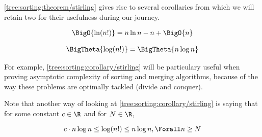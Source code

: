 \ref{tree:sorting:theorem/stirling} gives rise to several corollaries from
which we will retain two for their usefulness during our journey.


\begin{corollary}
\begin{align*}
\BigO{\ln(n!)} &= n \ln n - n + \BigO{n}\\
\end{align*}
\end{corollary}



\begin{corollary}
\label{tree:sorting:corollary/stirling}
\begin{align*}
\BigTheta{\log(n!)} &= \BigTheta{n \log n}\\
\end{align*}
\end{corollary}


For example, \ref{tree:sorting:corollary/stirling} will be particulary useful
when proving asymptotic complexity of sorting and merging algorithms, because
of the way these problems are optimally tackled (divide and conquer).

Note that another way of looking at \ref{tree:sorting:corollary/stirling} is
saying that for some constant $c \in \R$ and for $N \in \R$,

\begin{displaymath}
c \cdot n \log n \leq \log(n!) \leq n \log n, \Forall n \geq N
\end{displaymath}

